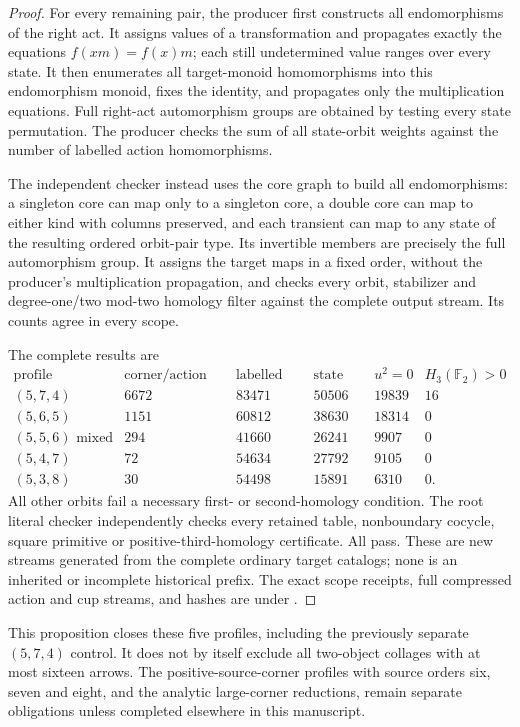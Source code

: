 \begin{proof}
For every remaining pair, the producer
 first constructs all
endomorphisms of the right act. It assigns values of a
transformation and propagates exactly the equations
$f(xm)=f(x)m$; each still undetermined value ranges over every
state. It then enumerates all target-monoid homomorphisms into
this endomorphism monoid, fixes the identity, and propagates
only the multiplication equations. Full right-act automorphism
groups are obtained by testing every state permutation. The
producer checks the sum of all state-orbit weights against the
number of labelled action homomorphisms.

The independent checker
 instead uses the
core graph to build all endomorphisms: a singleton core can
map only to a singleton core, a double core can map to either
kind with columns preserved, and each transient can map to
any state of the resulting ordered orbit-pair type. Its
invertible members are precisely the full automorphism group.
It assigns the target maps in a fixed order, without the
producer's multiplication propagation, and checks every orbit,
stabilizer and degree-one/two mod-two homology filter against
the complete output stream. Its counts agree in every scope.

The complete results are
\[
\begin{array}{c|r|r|r|r|r}
\text{profile}&\text{corner/action scopes}&\text{labelled actions}
 &\text{state orbits}&u^2=0&H_3(\mathbb F_2)>0\\\hline
(5,7,4)&6672&83471&50506&19839&16\\
(5,6,5)&1151&60812&38630&18314&0\\
(5,5,6)\text{ mixed}&294&41660&26241&9907&0\\
(5,4,7)&72&54634&27792&9105&0\\
(5,3,8)&30&54498&15891&6310&0.
\end{array}
\]
All other orbits fail a necessary first- or second-homology
condition. The root literal checker
 independently checks
every retained table, nonboundary cocycle, square primitive
or positive-third-homology certificate. All pass. These are
new streams generated from the complete ordinary target
catalogs; none is an inherited or incomplete historical prefix.
The exact scope receipts, full compressed action and cup
streams, and hashes are under
.
\end{proof}

\begin{remark*}
This proposition closes these five profiles, including the
previously separate $(5,7,4)$ control. It does not by itself
exclude all two-object collages with at most sixteen arrows.
The positive-source-corner profiles with source orders six,
seven and eight, and the analytic large-corner reductions,
remain separate obligations unless completed elsewhere in
this manuscript.
\end{remark*}
